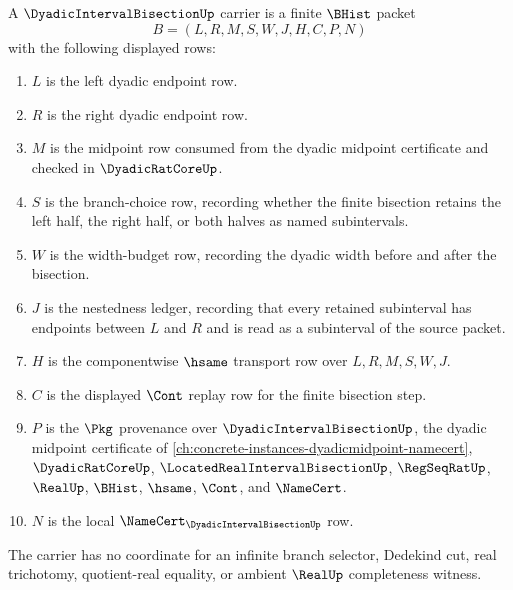 \begin{definition}
\label{def:dyadic-interval-bisection-carrier}
A $\DyadicIntervalBisectionUp$ carrier is a finite $\BHist$ packet
$$
B=(L,R,M,S,W,J,H,C,P,N)
$$
with the following displayed rows:
\begin{enumerate}
\item $L$ is the left dyadic endpoint row.
\item $R$ is the right dyadic endpoint row.
\item $M$ is the midpoint row consumed from the dyadic midpoint certificate and checked in $\DyadicRatCoreUp$.
\item $S$ is the branch-choice row, recording whether the finite bisection retains the left half, the right half, or both halves as named subintervals.
\item $W$ is the width-budget row, recording the dyadic width before and after the bisection.
\item $J$ is the nestedness ledger, recording that every retained subinterval has endpoints between $L$ and $R$ and is read as a subinterval of the source packet.
\item $H$ is the componentwise $\hsame$ transport row over $L,R,M,S,W,J$.
\item $C$ is the displayed $\Cont$ replay row for the finite bisection step.
\item $P$ is the $\Pkg$ provenance over $\DyadicIntervalBisectionUp$, the dyadic midpoint certificate of \autoref{ch:concrete-instances-dyadicmidpoint-namecert}, $\DyadicRatCoreUp$, $\LocatedRealIntervalBisectionUp$, $\RegSeqRatUp$, $\RealUp$, $\BHist$, $\hsame$, $\Cont$, and $\NameCert$.
\item $N$ is the local $\NameCert_{\DyadicIntervalBisectionUp}$ row.
\end{enumerate}
The carrier has no coordinate for an infinite branch selector, Dedekind cut, real trichotomy, quotient-real equality, or ambient $\RealUp$ completeness witness.
\end{definition}

